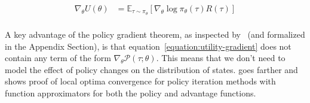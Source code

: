 \documentclass{../main.tex}{subfiles}
\begin{document}
\begin{equation}\label{equation:utility-gradient}
\begin{aligned}
\nabla_{\theta} U(\theta) & = \mathbb{E}_{\tau \sim \pi_{\theta}} [\nabla_{\theta} \log \pi_{\theta}(\tau) R(\tau)] \\
\end{aligned}
\end{equation}

A key advantage of the policy gradient theorem, as inspected by~\cite{Sutton1999} (and formalized in the Appendix Section), is that equation~\ref{equation:utility-gradient} does not contain any term of the form $\nabla_{\theta}\mathcal{P}(\tau ; \theta)$. This means that we don't need to model the effect of policy changes on the distribution of states. \citep{Sutton1999} goes farther and shows proof of local optima convergence for policy iteration methods with function approximators for both the policy and advantage functions.

%       


\end{document}
